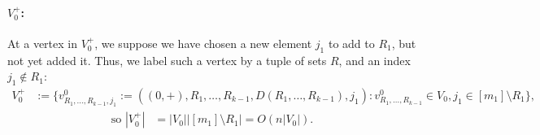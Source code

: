\documentclass{theoretics}
\renewcommand{\>}{\rangle}
\newcommand{\<}{\langle}
\renewcommand{\(}{\left(}
\renewcommand{\)}{\right)}
\def\abs#1{\left| #1 \right|}
\begin{document}
\paragraph{$V_0^+$:} At a vertex in $V_0^+$, we suppose we have chosen a new element $j_1$ to add to $R_1$, but not yet added it. Thus, we label such a vertex by a tuple of sets $R$, and an index $j_1\not\in R_1$: 
\begin{align*}
	V_0^+ & :=\Big\{v^{0}_{R_1,\dots,R_{k-1},j_1}:=((0,+),R_1,\dots,R_{k-1},D(R_1,\dots,R_{k-1}),j_1): 
	 v^0_{R_1,\dots,R_{k-1}} \in V_0, j_1\in [m_1]\setminus R_1\Big\},
\end{align*}
\begin{equation}
\begin{split}
\mbox{so } 
	\abs{V_0^+} &= \abs{V_0}\abs{[m_1] \setminus R_1} = O\left(n\abs{V_0}\right).
\end{split}\label{eq:kV1}
\end{equation}
\end{document}
